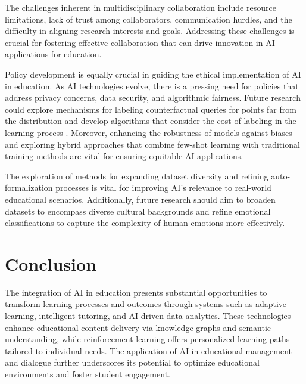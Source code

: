 The challenges inherent in multidisciplinary collaboration include resource limitations, lack of trust among collaborators, communication hurdles, and the difficulty in aligning research interests and goals. Addressing these challenges is crucial for fostering effective collaboration that can drive innovation in AI applications for education.



Policy development is equally crucial in guiding the ethical implementation of AI in education. As AI technologies evolve, there is a pressing need for policies that address privacy concerns, data security, and algorithmic fairness. Future research could explore mechanisms for labeling counterfactual queries for points far from the distribution and develop algorithms that consider the cost of labeling in the learning process \cite{sen2018supervisingfeatureinfluence}. Moreover, enhancing the robustness of models against biases and exploring hybrid approaches that combine few-shot learning with traditional training methods are vital for ensuring equitable AI applications.



The exploration of methods for expanding dataset diversity and refining auto-formalization processes is vital for improving AI's relevance to real-world educational scenarios. Additionally, future research should aim to broaden datasets to encompass diverse cultural backgrounds and refine emotional classifications to capture the complexity of human emotions more effectively.














\section{Conclusion} \label{sec:Conclusion}





The integration of AI in education presents substantial opportunities to transform learning processes and outcomes through systems such as adaptive learning, intelligent tutoring, and AI-driven data analytics. These technologies enhance educational content delivery via knowledge graphs and semantic understanding, while reinforcement learning offers personalized learning paths tailored to individual needs. The application of AI in educational management and dialogue further underscores its potential to optimize educational environments and foster student engagement.



